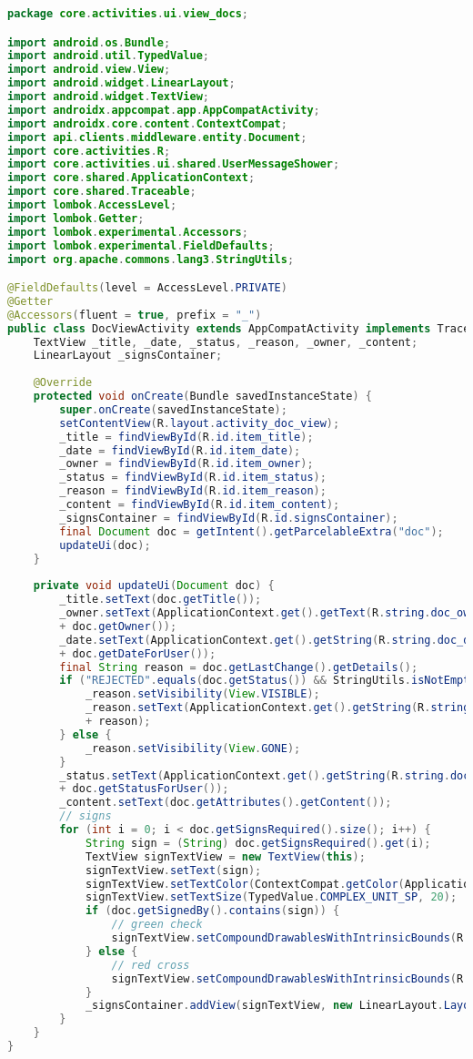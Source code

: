 \begin{lstlisting}[language=Java]
package core.activities.ui.view_docs;

import android.os.Bundle;
import android.util.TypedValue;
import android.view.View;
import android.widget.LinearLayout;
import android.widget.TextView;
import androidx.appcompat.app.AppCompatActivity;
import androidx.core.content.ContextCompat;
import api.clients.middleware.entity.Document;
import core.activities.R;
import core.activities.ui.shared.UserMessageShower;
import core.shared.ApplicationContext;
import core.shared.Traceable;
import lombok.AccessLevel;
import lombok.Getter;
import lombok.experimental.Accessors;
import lombok.experimental.FieldDefaults;
import org.apache.commons.lang3.StringUtils;

@FieldDefaults(level = AccessLevel.PRIVATE)
@Getter
@Accessors(fluent = true, prefix = "_")
public class DocViewActivity extends AppCompatActivity implements Traceable, UserMessageShower {
	TextView _title, _date, _status, _reason, _owner, _content;
	LinearLayout _signsContainer;
	
	@Override
	protected void onCreate(Bundle savedInstanceState) {
		super.onCreate(savedInstanceState);
		setContentView(R.layout.activity_doc_view);
		_title = findViewById(R.id.item_title);
		_date = findViewById(R.id.item_date);
		_owner = findViewById(R.id.item_owner);
		_status = findViewById(R.id.item_status);
		_reason = findViewById(R.id.item_reason);
		_content = findViewById(R.id.item_content);
		_signsContainer = findViewById(R.id.signsContainer);
		final Document doc = getIntent().getParcelableExtra("doc");
		updateUi(doc);
	}
	
	private void updateUi(Document doc) {
		_title.setText(doc.getTitle());
		_owner.setText(ApplicationContext.get().getText(R.string.doc_owner_prefix) + " "
		+ doc.getOwner());
		_date.setText(ApplicationContext.get().getString(R.string.doc_date_prefix) + " "
		+ doc.getDateForUser());
		final String reason = doc.getLastChange().getDetails();
		if ("REJECTED".equals(doc.getStatus()) && StringUtils.isNotEmpty(reason)) {
			_reason.setVisibility(View.VISIBLE);
			_reason.setText(ApplicationContext.get().getString(R.string.doc_reject_reason) + " "
			+ reason);
		} else {
			_reason.setVisibility(View.GONE);
		}
		_status.setText(ApplicationContext.get().getString(R.string.doc_status_prefix) + " "
		+ doc.getStatusForUser());
		_content.setText(doc.getAttributes().getContent());
		// signs
		for (int i = 0; i < doc.getSignsRequired().size(); i++) {
			String sign = (String) doc.getSignsRequired().get(i);
			TextView signTextView = new TextView(this);
			signTextView.setText(sign);
			signTextView.setTextColor(ContextCompat.getColor(ApplicationContext.get(), R.color.colorFullBlack));
			signTextView.setTextSize(TypedValue.COMPLEX_UNIT_SP, 20);
			if (doc.getSignedBy().contains(sign)) {
				// green check
				signTextView.setCompoundDrawablesWithIntrinsicBounds(R.drawable.ic_approve_small, 0, 0, 0);
			} else {
				// red cross
				signTextView.setCompoundDrawablesWithIntrinsicBounds(R.drawable.ic_reject_small, 0, 0, 0);
			}
			_signsContainer.addView(signTextView, new LinearLayout.LayoutParams(LinearLayout.LayoutParams.WRAP_CONTENT, LinearLayout.LayoutParams.WRAP_CONTENT));
		}
	}
}


\end{lstlisting}
